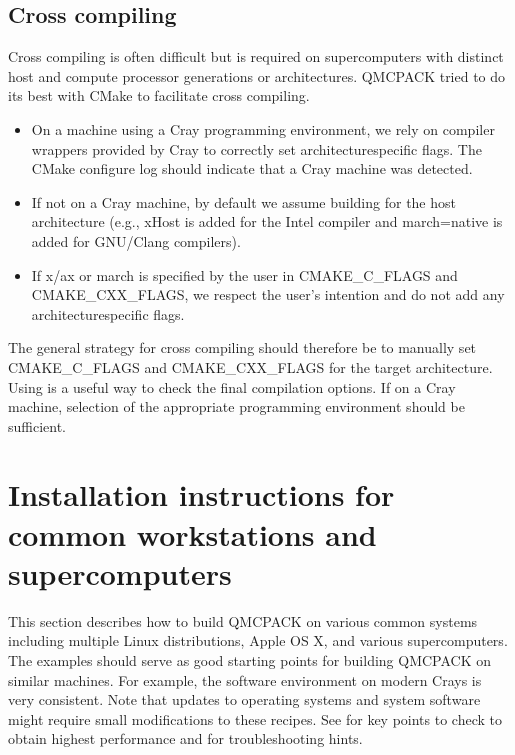 \documentclass[letterpaper,10pt,english]{sphinxmanual}
\begin{document}
\subsection{Cross compiling}
\label{\detokenize{installation:cross-compiling}}
Cross compiling is often difficult but is required on supercomputers
with distinct host and compute processor generations or architectures.
QMCPACK tried to do its best with CMake to facilitate cross compiling.
\begin{itemize}
\item {} 
On a machine using a Cray programming environment, we rely on
compiler wrappers provided by Cray to correctly set architecture\sphinxhyphen{}specific
flags. The CMake configure log should indicate that a
Cray machine was detected.

\item {} 
If not on a Cray machine, by default we assume building for
the host architecture (e.g., \sphinxhyphen{}xHost is added for the Intel compiler
and \sphinxhyphen{}march=native is added for GNU/Clang compilers).

\item {} 
If \sphinxhyphen{}x/\sphinxhyphen{}ax or \sphinxhyphen{}march is specified by the user in CMAKE\_C\_FLAGS and CMAKE\_CXX\_FLAGS,
we respect the user’s intention and do not add any architecture\sphinxhyphen{}specific flags.

\end{itemize}

The general strategy for cross compiling should therefore be to
manually set CMAKE\_C\_FLAGS and CMAKE\_CXX\_FLAGS for the target
architecture. Using  is a useful way to check the
final compilation options.  If on a Cray machine, selection of the
appropriate programming environment should be sufficient.


\section{Installation instructions for common workstations and supercomputers}
\label{\detokenize{installation:installation-instructions-for-common-workstations-and-supercomputers}}\label{\detokenize{installation:installexamples}}
This section describes how to build QMCPACK on various common systems
including multiple Linux distributions, Apple OS X, and various
supercomputers. The examples should serve as good starting points for
building QMCPACK on similar machines. For example, the software
environment on modern Crays is very consistent. Note that updates to
operating systems and system software might require small modifications
to these recipes. See {\hyperref[\detokenize{installation:buildperformance}]{}} for key
points to check to obtain highest performance and
{\hyperref[\detokenize{installation:troubleshoot}]{}} for troubleshooting hints.
\end{document}
